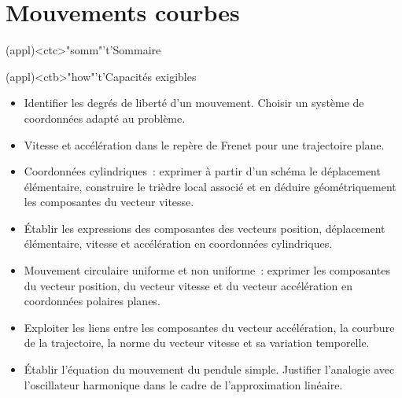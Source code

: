 \documentclass[../../main/main.tex]{subfiles}
\begin{document}
\setcounter{chapter}{2}


\chapter{Mouvements courbes}

\vspace*{\fill}

\begin{tcn}(appl)<ctc>"somm"'t'{Sommaire}
	\let\item\olditem
	\vspace{-15pt}
	\minitoc
	\vspace{-25pt}
\end{tcn}

\begin{tcn}[sidebyside, fontupper=\small, fontlower=\small]
	(appl)<ctb>"how"'t'{Capacités exigibles}
	\begin{itemize}[label=\rcheck]
		\item Identifier les degrés de liberté d'un mouvement. Choisir un système
		      de coordonnées adapté au problème.

		\item Vitesse et accélération dans le repère de Frenet pour une
		      trajectoire plane.

		\item Coordonnées cylindriques~: exprimer à partir d'un schéma le
		      déplacement élémentaire, construire le trièdre local associé et en
		      déduire géométriquement les composantes du vecteur vitesse.

		\item Établir les expressions des composantes des vecteurs position,
		      déplacement élémentaire, vitesse et accélération en coordonnées
		      cylindriques.
	\end{itemize}
	\tcblower
	\begin{itemize}[label=\rcheck]
		\item Mouvement circulaire uniforme et non uniforme~: exprimer les
		      composantes du vecteur position, du vecteur vitesse et du vecteur
		      accélération en coordonnées polaires planes.

		\item Exploiter les liens entre les composantes du vecteur accélération,
		      la courbure de la trajectoire, la norme du vecteur vitesse et sa
		      variation temporelle.

		\item Établir l’équation du mouvement du pendule simple. Justifier
		      l’analogie avec l'oscillateur harmonique dans le cadre de
		      l'approximation linéaire.
	\end{itemize}
\end{tcn}
\end{document}

